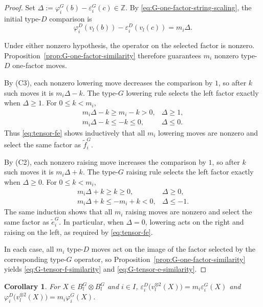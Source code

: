 \documentclass[11pt,reqno]{amsart}
\numberwithin{table}{section}
\numberwithin{equation}{section}
\theoremstyle{plain}
\newtheorem{corollary}[theorem]{Corollary}
\theoremstyle{definition}
\begin{document}
\begin{proof}
	Set
	\(\Delta:=\varphi_i^G(b)-\varepsilon_i^G(c)\in\mathbb Z\).
	By \eqref{eq:G-one-factor-string-scaling}, the initial
	type-\(D\) comparison is
	\[
	\varphi_i^D(v_l(b))
	-
	\varepsilon_i^D(v_l(c))
	=
	m_i\Delta.
	\]
	
	Under either nonzero hypothesis, the operator on the selected
	factor is nonzero.
	Proposition~\ref{prop:G-one-factor-similarity} therefore
	guarantees \(m_i\) nonzero type-\(D\) one-factor moves.
	
	By \textup{(C3)}, each nonzero lowering move decreases the
	comparison by \(1\), so after \(k\) such moves it is
	\(m_i\Delta-k\).
	The type-\(G\) lowering rule selects the left factor exactly
	when \(\Delta\ge1\).
	For \(0\le k<m_i\),
	\[
	\begin{array}{ll}
		m_i\Delta-k\ge m_i-k>0,
		&\Delta\ge1,\\
		m_i\Delta-k\le-k\le0,
		&\Delta\le0.
	\end{array}
	\]
	Thus \eqref{eq:tensor-fe} shows inductively that all \(m_i\)
	lowering moves are nonzero and select the same factor as
	\(\widetilde f_i^G\).
	
	By \textup{(C2)}, each nonzero raising move increases the
	comparison by \(1\), so after \(k\) such moves it is
	\(m_i\Delta+k\).
	The type-\(G\) raising rule selects the left factor exactly
	when \(\Delta\ge0\).
	For \(0\le k<m_i\),
	\[
	\begin{array}{ll}
		m_i\Delta+k\ge k\ge0,
		&\Delta\ge0,\\
		m_i\Delta+k\le-m_i+k<0,
		&\Delta\le-1.
	\end{array}
	\]
	The same induction shows that all \(m_i\) raising moves are
	nonzero and select the same factor as \(\widetilde e_i^G\).
	In particular, when \(\Delta=0\), lowering acts on the right
	and raising on the left, as required by \eqref{eq:tensor-fe}.
	
In each case, all \(m_i\) type-\(D\) moves act on the image
of the factor selected by the corresponding type-\(G\) operator, so Proposition~\ref{prop:G-one-factor-similarity} yields
\eqref{eq:G-tensor-f-similarity} and
\eqref{eq:G-tensor-e-similarity}.
\end{proof}

\begin{corollary}
	\label{cor:G-tensor-string-scaling}
For \(X\in B_l^G\otimes B_l^G\) and \(i\in I\),
\(\varepsilon_i^D\bigl(v_l^{\otimes2}(X)\bigr)
=m_i\varepsilon_i^G(X)\) and
\(\varphi_i^D\bigl(v_l^{\otimes2}(X)\bigr)
=m_i\varphi_i^G(X)\).
\end{corollary}
\end{document}
